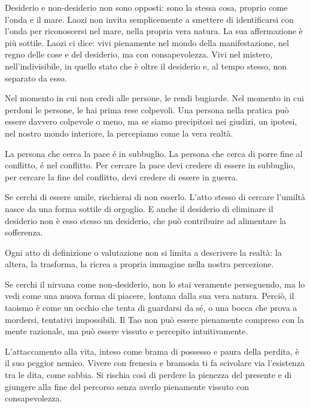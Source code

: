 \documentclass[12pt]{book} %
\begin{document}
Desiderio e non-desiderio non sono opposti: sono la stessa cosa, proprio come l’onda e il mare.
Laozi non invita semplicemente a smettere di identificarsi con l’onda per riconoscersi nel mare, nella propria vera natura. La sua affermazione è più sottile.
Laozi ci dice: vivi pienamente nel mondo della manifestazione, nel regno delle cose e del desiderio, ma con consapevolezza. Vivi nel mistero, nell’indivisibile, in quello stato che è oltre il desiderio e, al tempo stesso, non separato da esso.

Nel momento in cui non credi alle persone, le rendi bugiarde.
Nel momento in cui perdoni le persone, le hai prima rese colpevoli.
Una persona nella pratica può essere davvero colpevole o meno, ma se siamo precipitosi nei giudizi, un ipotesi, nel nostro mondo interiore, la percepiamo come la vera realtà.

La persona che cerca la pace é in subbuglio.
La persona che cerca di porre fine al conflitto, é nel conflitto.
Per cercare la pace devi credere di essere in subbuglio, per cercare la fine del conflitto, devi credere di essere in guerra.

Se cerchi di essere umile, rischierai di non esserlo. L’atto stesso di cercare l’umiltà nasce da una forma sottile di orgoglio.
E anche il desiderio di eliminare il desiderio non è esso stesso un desiderio, che può contribuire ad alimentare la sofferenza.

Ogni atto di definizione o valutazione non si limita a descrivere la realtà: la altera, la trasforma, la ricrea a propria immagine nella nostra percezione.

Se cerchi il nirvana come non-desiderio, non lo stai veramente perseguendo, ma lo vedi come una nuova forma di piacere, lontana dalla sua vera natura. Perciò, il taoismo è come un occhio che tenta di guardarsi da sé, o una bocca che prova a mordersi, tentativi impossibili. Il Tao non può essere pienamente compreso con la mente razionale, ma può essere vissuto e percepito intuitivamente.

L’attaccamento alla vita, inteso come brama di possesso e paura della perdita, è il suo peggior nemico.
Vivere con frenesia e bramosia ti fa scivolare via l’esistenza tra le dita, come sabbia. Si rischia così di perdere la pienezza del presente e di giungere alla fine del percorso senza averlo pienamente vissuto con consapevolezza.
\end{document}
